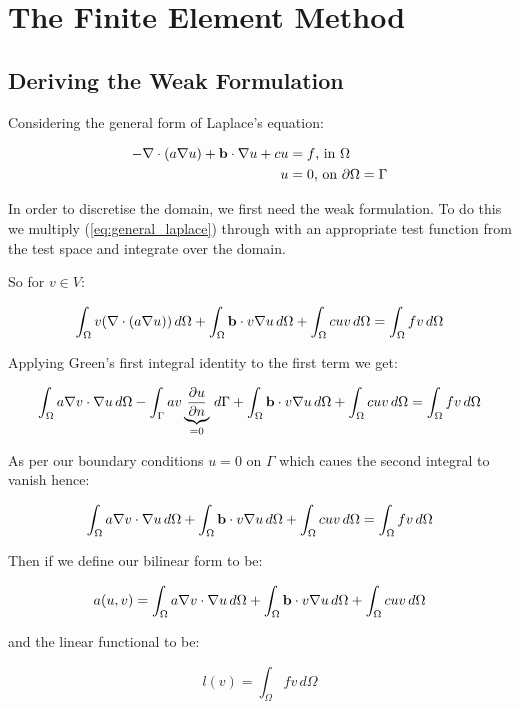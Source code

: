 \chapter{The Finite Element Method}


\section{Deriving the Weak Formulation}

Considering the general form of Laplace's equation:

\begin{align}\label{eq:general_laplace}
    -\nabla\cdot(a\nabla{u}) + \mathbf{b}\cdot\nabla{u} + cu &= f \text{, in } \Omega \\
    u &= 0 \text{, on } \partial\Omega = \Gamma
\end{align}

In order to discretise the domain, we first need the weak formulation. To do
this we multiply (\ref{eq:general_laplace}) through with an appropriate test
function from the test space and integrate over the domain.

So for $v \in V$:

\[
    \int_{\Omega}{v(\nabla\cdot(a\nabla{u}))}\,d\Omega +
    \int_{\Omega}\mathbf{b}\cdot v\nabla{u}\,d\Omega +
    \int_{\Omega}cuv\,d\Omega = \int_{\Omega}fv\,d\Omega
\]

Applying Green's first integral identity to the first term we get:

\[
    \int_{\Omega}a\nabla{v}\cdot\nabla{u}\,d\Omega -
    \int_{\Gamma}av
      \underbrace{\frac{\partial{u}}{\partial{n}}}_{=0}
      \,d\Gamma +
    \int_{\Omega}\mathbf{b}\cdot v\nabla{u}\,d\Omega + \int_{\Omega}cuv\,d\Omega =
    \int_{\Omega}fv\,d\Omega
\]

As per our boundary conditions $u=0$ on $\Gamma$ which caues the second
integral to vanish hence:

\[
    \int_{\Omega}a\nabla{v}\cdot\nabla{u}\,d\Omega +
    \int_{\Omega}\mathbf{b}\cdot v\nabla{u}\,d\Omega + \int_{\Omega}cuv\,d\Omega =
    \int_{\Omega}fv\,d\Omega
\]

Then if we define our bilinear form to be:

\[
    a(u,v) =
    \int_{\Omega}a\nabla{v}\cdot\nabla{u}\,d\Omega +
    \int_{\Omega}\mathbf{b}\cdot v\nabla{u}\,d\Omega + \int_{\Omega}cuv\,d\Omega
\]

and the linear functional to be:

\[
    l(v) = \int_{\Omega}fv\,d\Omega
\]

